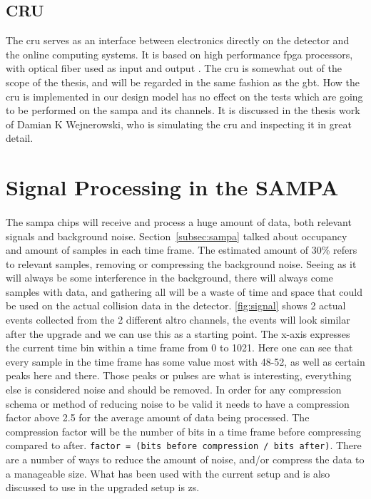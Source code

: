 \documentclass[a4paper, 12pt, openright, twoside]{report}
\newcommand{\codeword}[1]{\texttt{#1}}
\begin{document}
\subsection{CRU}
The \gls{cru} serves as an interface between electronics directly on the detector and the online computing systems.
It is based on high performance \gls{fpga} processors, with optical fiber used as input and output \cite{tdr-015}. 
The \gls{cru} is somewhat out of the scope of the thesis, and will be regarded in the same fashion as the \gls{gbt}.
How the \gls{cru} is implemented in our design model has no effect on the tests which are going to be performed on the \gls{sampa} and its channels.
It is discussed in the thesis work of Damian K Wejnerowski, who is simulating the \gls{cru} and inspecting it in great detail.

\section{Signal Processing in the SAMPA}
\paragraph{}
The \gls{sampa} chips will receive and process a huge amount of data, both relevant signals and background noise.
Section~\ref{subsec:sampa} talked about occupancy and amount of samples in each time frame.
The estimated amount of 30\% refers to relevant samples, removing or compressing the background noise.
Seeing as it will always be some interference in the background, there will always come samples with data, and gathering all will be a waste of time and space that could be used on the actual collision data in the detector.
\ref{fig:signal} shows 2 actual events collected from the 2 different \gls{altro} channels, the events will look similar after the upgrade and we can use this as a starting point.
The x-axis expresses the current time bin within a time frame from 0 to 1021.
Here one can see that every sample in the time frame has some value most with 48-52, as well as certain peaks here and there.
Those peaks or pulses are what is interesting, everything else is considered noise and should be removed.
In order for any compression schema or method of reducing noise to be valid it needs to have a compression factor above 2.5 for the average amount of data being processed.
The compression factor will be the number of bits in a time frame before compressing compared to after. \codeword{factor = (bits before compression / bits after)}.
There are a number of ways to reduce the amount of noise, and/or compress the data to a manageable size.
What has been used with the current setup and is also discussed to use in the upgraded setup is \gls{zs}.
\end{document}
